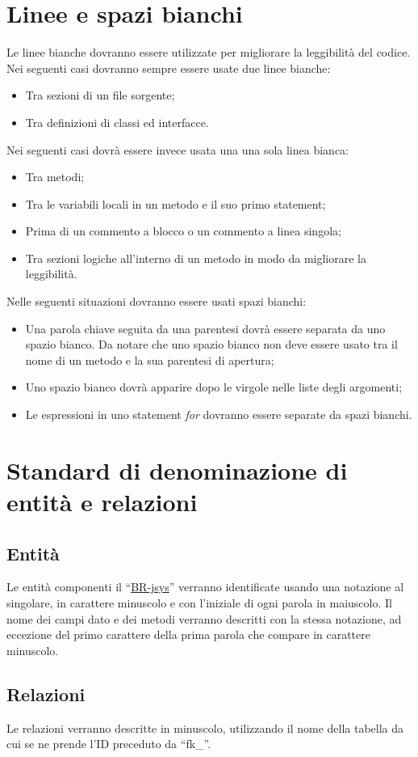 \section{Linee e spazi bianchi}
Le linee bianche dovranno essere utilizzate per migliorare la leggibilit\`a del codice. Nei seguenti casi dovranno sempre essere usate due linee bianche:
\begin{itemize}
\item Tra sezioni di un file sorgente;
\item Tra definizioni di classi ed interfacce.
\end{itemize}
Nei seguenti casi dovr\`a essere invece usata una una sola linea bianca:
\begin{itemize}
\item Tra metodi;
\item Tra le variabili locali in un metodo e il suo primo statement;
\item Prima di un commento a blocco o un commento a linea singola;
\item Tra sezioni logiche all'interno di un metodo in modo da migliorare la leggibilit\`a.
\end{itemize}
Nelle seguenti situazioni dovranno essere usati spazi bianchi:
\begin{itemize}
\item Una parola chiave seguita da una parentesi dovr\`a essere separata da uno spazio bianco. Da notare che uno spazio bianco non deve essere usato tra il nome di un metodo e la sua parentesi di apertura;
\item Uno spazio bianco dovr\`a apparire dopo le virgole nelle liste degli argomenti;
\item Le espressioni in uno statement \textit{for} dovranno essere separate da spazi bianchi.
\end{itemize}

\section{Standard di denominazione di entit\`a e relazioni}
\subsection{Entit\`a}
Le entit\`a componenti il ``\underline{BR-jsys}'' verranno identificate usando una notazione al singolare, in carattere minuscolo e con l'iniziale di ogni parola in maiuscolo. Il nome dei campi dato e dei metodi verranno descritti con la stessa notazione, ad eccezione del primo carattere della prima parola che compare in carattere minuscolo.
\subsection{Relazioni}
Le relazioni verranno descritte in minuscolo, utilizzando il nome della tabella da cui se ne prende l'ID preceduto da ``fk\_''.



